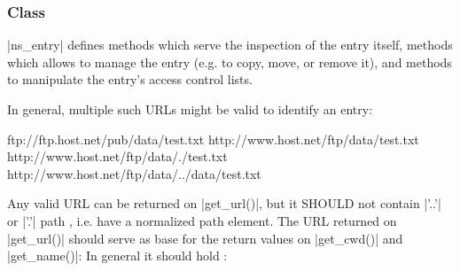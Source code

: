  
  \subsubsection*{Class }
 
    |ns_entry| defines methods which serve the inspection of the
    entry itself, methods which allows to manage the entry (e.g.
    to copy, move, or remove it),  and methods to manipulate the
    entry's access control lists.
 
    In general, multiple such URLs might be valid to identify an
    entry:
 
    \up\up
    \begin{myspec}
       ftp://ftp.host.net/pub/data/test.txt
      http://www.host.net/ftp/data/test.txt
      http://www.host.net/ftp/data/./test.txt
      http://www.host.net/ftp/data/../data/test.txt
    \end{myspec}
    \up
 
 
    Any valid URL can be returned on |get_url()|, but it SHOULD
    not contain |'..'| or |'.'|  path
    , i.e.   have
    a normalized path element.  The URL returned on |get_url()|
    should serve as base for the return values on |get_cwd()|
    and |get_name()|: In general it should hold :
    
    \shift{}
    \XMark

    

